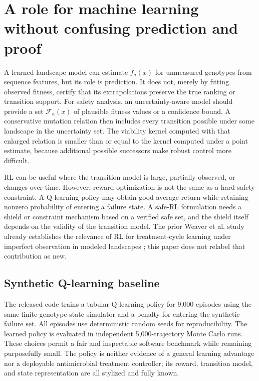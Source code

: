 \documentclass[11pt]{article}
\theoremstyle{definition}\newtheorem{definition}[proposition]{Definition}\theoremstyle{remark}\newtheorem{remark}[proposition]{Remark}
\begin{document}
\section{A role for machine learning without confusing prediction and proof}
A learned landscape model can estimate $f_a(x)$ for unmeasured genotypes from sequence features, but its role is prediction. It does not, merely by fitting observed fitness, certify that its extrapolations preserve the true ranking or transition support. For safety analysis, an uncertainty-aware model should provide a set $\mathcal{F}_a(x)$ of plausible fitness values or a confidence bound. A conservative mutation relation then includes every transition possible under some landscape in the uncertainty set. The viability kernel computed with that enlarged relation is smaller than or equal to the kernel computed under a point estimate, because additional possible successors make robust control more difficult.

RL can be useful where the transition model is large, partially observed, or changes over time. However, reward optimization is not the same as a hard safety constraint. A Q-learning policy may obtain good average return while retaining nonzero probability of entering a failure state. A safe-RL formulation needs a shield or constraint mechanism based on a verified safe set, and the shield itself depends on the validity of the transition model. The prior Weaver et al. study already establishes the relevance of RL for treatment-cycle learning under imperfect observation in modeled landscapes \citep{Weaver2024}; this paper does not relabel that contribution as new.

\subsection{Synthetic Q-learning baseline}
The released code trains a tabular Q-learning policy for 9,000 episodes using the same finite genotype-state simulator and a penalty for entering the synthetic failure set. All episodes use deterministic random seeds for reproducibility. The learned policy is evaluated in independent 5,000-trajectory Monte Carlo runs. These choices permit a fair and inspectable software benchmark while remaining purposefully small. The policy is neither evidence of a general learning advantage nor a deployable antimicrobial treatment controller; its reward, transition model, and state representation are all stylized and fully known.
\end{document}
